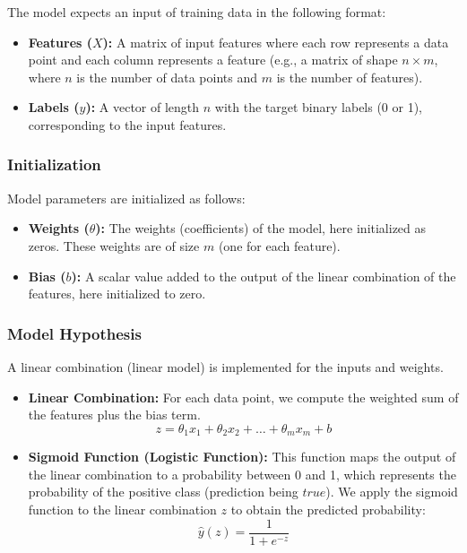 \documentclass{article}
\theoremstyle{plain}
\theoremstyle{definition}
\theoremstyle{remark}
\begin{document}
The model expects an input of training data in the following format:
\begin{itemize}

\item \textbf{Features ($X$):} A matrix of input features where each row represents a data point and each column represents a feature (e.g., a matrix of shape $n \times m$, where $n$ is the number of data points and $m$ is the number of features).

\item \textbf{Labels ($y$):} A vector of length $n$ with the target binary labels (0 or 1), corresponding to the input features.
\end{itemize}


\subsubsection{Initialization}

Model parameters are initialized as follows:

\begin{itemize}
\item \textbf{Weights ($\theta$):} The weights (coefficients) of the model, here initialized as zeros. These weights are of size $m$ (one for each feature).

\item \textbf{Bias ($b$):} A scalar value added to the output of the linear combination of the features, here initialized to zero.

\end{itemize}


\subsubsection{Model Hypothesis}

A linear combination (linear model) is implemented for the inputs and weights.

\begin{itemize}

\item \textbf{Linear Combination:} For each data point, we compute the weighted sum of the features plus the bias term.
$$
z = \theta_1 x_1 + \theta_2 x_2 + \dots + \theta_m x_m + b
$$

\item \textbf{Sigmoid Function (Logistic Function):} This function maps the output of the linear combination to a probability between 0 and 1, which represents the probability of the positive class (prediction being $true$). We apply the sigmoid function to the linear combination $z$ to obtain the predicted probability:
$$
\hat{y}(z) = \frac{1}{1 + e^{-z}}
$$

\end{itemize}
\end{document}
